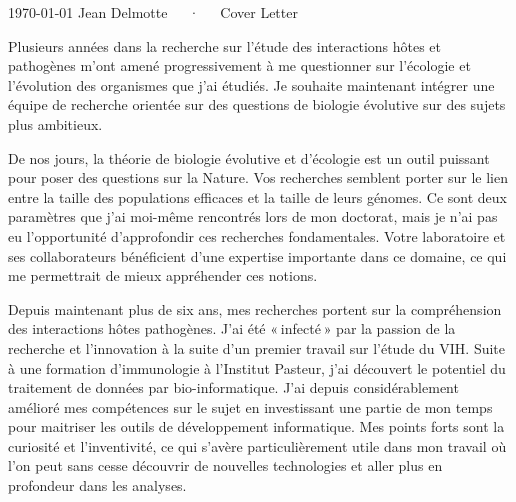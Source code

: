 \documentclass[11pt, a4paper]{awesome-cv}
\begin{document}
\makecvheader[R]

\makecvfooter
  {\today}
  {Jean Delmotte~~~·~~~Cover Letter}
  {\thepage}
\makelettertitle

\begin{cvletter}

Plusieurs années dans la recherche sur l’étude des interactions hôtes et pathogènes m’ont amené progressivement à me questionner sur l’écologie et l'évolution des organismes que j’ai étudiés. Je souhaite maintenant intégrer une équipe de recherche orientée sur des questions de biologie évolutive sur des sujets plus ambitieux.

De nos jours, la théorie de biologie évolutive et d’écologie est un outil puissant pour poser des questions sur la Nature. Vos recherches semblent porter sur le lien entre la taille des populations efficaces et la taille de leurs génomes. Ce sont deux paramètres que j’ai moi-même rencontrés lors de mon doctorat, mais je n’ai pas eu l’opportunité d’approfondir ces recherches fondamentales. Votre laboratoire et ses collaborateurs bénéficient d’une expertise importante dans ce domaine, ce qui me permettrait de mieux appréhender ces notions.

Depuis maintenant plus de six ans, mes recherches portent sur la compréhension des interactions hôtes pathogènes. J'ai été « infecté » par la passion de la recherche et l’innovation à la suite d’un premier travail sur l'étude du VIH. Suite à une formation d'immunologie à l’Institut Pasteur, j’ai découvert le potentiel du traitement de données par bio-informatique. J’ai depuis considérablement amélioré mes compétences sur le sujet en investissant une partie de mon temps pour maitriser les outils de développement informatique. Mes points forts sont la curiosité et l'inventivité, ce qui s'avère particulièrement utile dans mon travail où l'on peut sans cesse découvrir de nouvelles technologies et aller plus en profondeur dans les analyses.


\end{cvletter}
\end{document}
